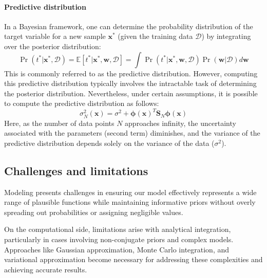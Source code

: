 \paragraph*{Predictive distribution}
In a Bayesian framework, one can determine the probability distribution of the target variable for a new sample $\mathbf{x}^\ast$ (given the training data $\mathcal{D}$) by integrating over the posterior distribution:
\[\Pr(t^\ast|\mathbf{x}^\ast,\mathcal{D})=\mathbb{E}\left[ t^\ast|\mathbf{x}^\ast,\mathbf{w},\mathcal{D} \right] = \int\Pr(t^\ast|\mathbf{x}^\ast,\mathbf{w},\mathcal{D})\Pr(\mathbf{w}|\mathcal{D})d\mathbf{w}\]
This is commonly referred to as the predictive distribution.
However, computing this predictive distribution typically involves the intractable task of determining the posterior distribution.
Nevertheless, under certain assumptions, it is possible to compute the predictive distribution as follows: 
\[\sigma_N^2(\mathbf{x})=\sigma^2+\boldsymbol{\phi}{(\mathbf{x})}^T\mathbf{S}_N\boldsymbol{\phi}(\mathbf{x})\]
Here, as the number of data points $N$ approaches infinity, the uncertainty associated with the parameters (second term) diminishes, and the variance of the predictive distribution depends solely on the variance of the data ($\sigma^2$). 























\subsection{Challenges and limitations}
Modeling presents challenges in ensuring our model effectively represents a wide range of plausible functions while maintaining informative priors without overly spreading out probabilities or assigning negligible values.

On the computational side, limitations arise with analytical integration, particularly in cases involving non-conjugate priors and complex models. 
Approaches like Gaussian approximation, Monte Carlo integration, and variational approximation become necessary for addressing these complexities and achieving accurate results.

